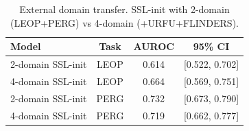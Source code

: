 \begin{table}[htbp]
\centering
\caption{External domain transfer. SSL-init with 2-domain (LEOP+PERG) vs 4-domain (+URFU+FLINDERS).}
\label{tab:external}
\begin{tabular}{lccc}
\toprule
Model & Task & AUROC & 95\% CI \\
\midrule
2-domain SSL-init & LEOP & 0.614 & [0.522, 0.702] \\
4-domain SSL-init & LEOP & 0.664 & [0.569, 0.751] \\
\midrule
2-domain SSL-init & PERG & 0.732 & [0.673, 0.790] \\
4-domain SSL-init & PERG & 0.719 & [0.662, 0.777] \\
\bottomrule
\end{tabular}
\end{table}
